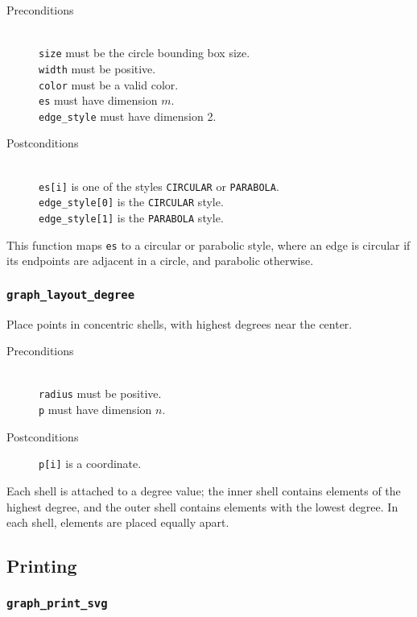 \begin{description}
 \item[Preconditions]~\\
   \texttt{size} must be the circle bounding box size.\\
   \texttt{width} must be positive.\\
   \texttt{color} must be a valid color.\\
   \texttt{es} must have dimension $m$.\\
   \texttt{edge\_style} must have dimension 2.
 \item[Postconditions]~\\
   \texttt{es[i]} is one of the styles \texttt{CIRCULAR} or \texttt{PARABOLA}.\\
   \texttt{edge\_style[0]} is the \texttt{CIRCULAR} style.\\
   \texttt{edge\_style[1]} is the \texttt{PARABOLA} style.\\
\end{description}

This function maps \texttt{es} to a circular or parabolic style, where
an edge is circular if its endpoints are adjacent in a circle, and 
parabolic otherwise.

\subsubsection{\texttt{graph\_layout\_degree}}

Place points in concentric shells, with highest degrees near the center.

\begin{description}
 \item[Preconditions]~\\
   \texttt{radius} must be positive.\\
   \texttt{p} must have dimension $n$.
 \item[Postconditions] \texttt{p[i]} is a coordinate.
\end{description}

Each shell is attached to a degree value; the inner shell contains elements
of the highest degree, and the outer shell contains elements with the lowest
degree. In each shell, elements are placed equally apart.

\subsection{Printing}

\subsubsection{\texttt{graph\_print\_svg}}

